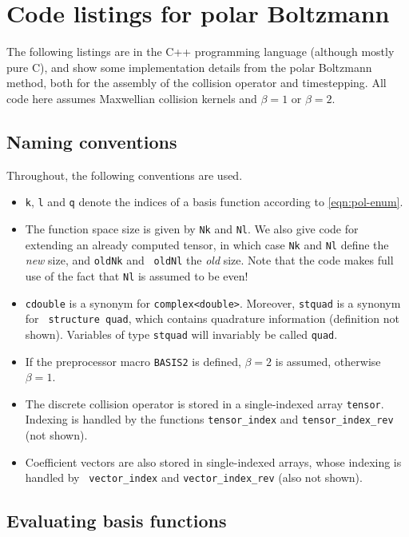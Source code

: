 \chapter{Code listings for polar Boltzmann}

The following listings are in the C++ programming language (although mostly pure C), and show some
implementation details from the polar Boltzmann method, both for the assembly of the collision operator and
timestepping. All code here assumes Maxwellian collision kernels and $\beta=1$ or $\beta=2$.

\section{Naming conventions}

Throughout, the following conventions are used.
\begin{itemize}
\item {\tt k}, {\tt l} and {\tt q} denote the indices of a basis function according to \eqref{eqn:pol-enum}.
\item The function space size is given by {\tt Nk} and {\tt Nl}. We also give code for extending an already
computed tensor, in which case {\tt Nk} and {\tt Nl} define the {\em new} size, and {\tt oldNk} and {\tt
oldNl} the {\em old} size. Note that the code makes full use of the fact that {\tt Nl} is assumed to be even!
\item {\tt cdouble} is a synonym for {\tt complex<double>}. Moreover, {\tt stquad} is a synonym for {\tt
structure quad}, which contains quadrature information (definition not shown). Variables of type {\tt stquad}
will invariably be called {\tt quad}.
\item If the preprocessor macro {\tt BASIS2} is defined, $\beta=2$ is assumed, otherwise $\beta=1$.
\item The discrete collision operator is stored in a single-indexed array {\tt tensor}. Indexing is handled by
the functions {\tt tensor\_index} and {\tt tensor\_index\_rev} (not shown).
\item Coefficient vectors are also stored in single-indexed arrays, whose indexing is handled by {\tt
vector\_index} and {\tt vector\_index\_rev} (also not shown).
\end{itemize}

\section{Evaluating basis functions}

